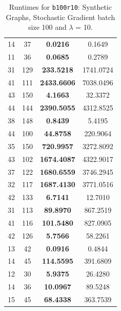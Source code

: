 \documentclass{article}
\begin{document}
\begin{table}[h]
\begin{tabular}{lccc}
14 & 37 & \textbf{0.0216} & 0.1649 \\
11 & 36 & \textbf{0.0685} & 0.2789 \\
31 & 129 & \textbf{233.5218} & 1741.0724 \\
41 & 111 & \textbf{2433.6606} & 7038.0496 \\
43 & 150 & \textbf{4.1663} & 32.3372 \\
44 & 144 & \textbf{2390.5055} & 4312.8525 \\
38 & 148 & \textbf{0.8439} & 5.4195 \\
44 & 100 & \textbf{44.8758} & 220.9064 \\
35 & 150 & \textbf{720.9957} & 3272.8092 \\
43 & 102 & \textbf{1674.4087} & 4322.9017 \\
37 & 122 & \textbf{1680.6559} & 3746.2945 \\
32 & 117 & \textbf{1687.4130} & 3771.0516 \\
42 & 133 & \textbf{6.7141} & 12.7010 \\
31 & 113 & \textbf{89.8970} & 867.2519 \\
41 & 116 & \textbf{101.5480} & 827.0905 \\
42 & 126 & \textbf{5.7566} & 58.2261 \\
13 & 42 & \textbf{0.0916} & 0.4844 \\
14 & 45 & \textbf{114.5595} & 391.6809 \\
12 & 30 & \textbf{5.9375} & 26.4280 \\
14 & 36 & \textbf{10.0967} & 89.5248 \\
15 & 45 & \textbf{68.4338} & 363.7539 \\
\bottomrule
\end{tabular}
\caption{Runtimes for \texttt{b100r10}: Synthetic Graphs, Stochastic Gradient batch size 100 and $\lambda$ = 10.}
\end{table}
\end{document}

